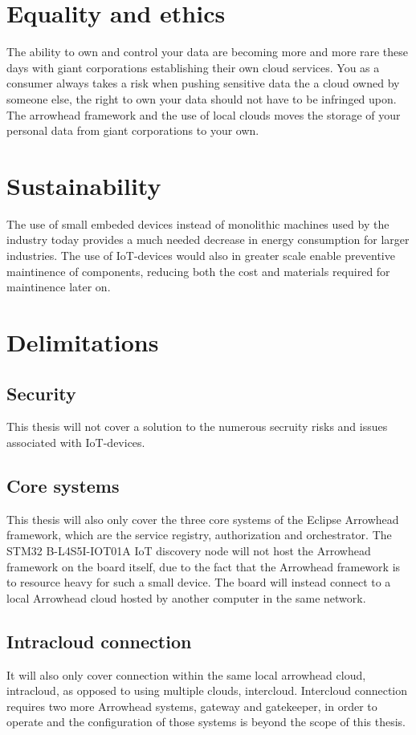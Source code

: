 \section{Equality and ethics}
The ability to own and control your data are becoming more and more rare these days with giant corporations establishing their own cloud services.
You as a consumer always takes a risk when pushing sensitive data the a cloud owned by someone else, the right to own your data should not have to be infringed upon. 
The arrowhead framework and the use of local clouds moves the storage of your personal data from giant corporations to your own. 
\section{Sustainability}
The use of small embeded devices instead of monolithic machines used by the industry today provides a much needed decrease in energy consumption for larger industries.
The use of IoT-devices would also in greater scale enable preventive maintinence of components, reducing both the cost and materials required for maintinence later on.
\section{Delimitations}
\subsection{Security}
This thesis will not cover a solution to the numerous secruity risks and issues associated with IoT-devices. 
\subsection{Core systems}
This thesis will also only cover the three core systems of the Eclipse Arrowhead framework, which are the service registry, authorization and orchestrator. 
The STM32 B-L4S5I-IOT01A IoT discovery node will not host the Arrowhead framework on the board itself, due to the fact that the Arrowhead framework is to resource heavy for such a small device.
The board will instead connect to a local Arrowhead cloud hosted by another computer in the same network. 
\subsection{Intracloud connection}
It will also only cover connection within the same local arrowhead cloud, intracloud, as opposed to using multiple clouds, intercloud.
Intercloud connection requires two more Arrowhead systems, gateway and gatekeeper, in order to operate and the configuration of those systems is beyond the scope of this thesis.
